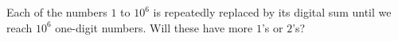 Each of the numbers $1$ to $10^6$ is repeatedly replaced by its digital sum until we reach $10^6$ one-digit numbers. Will these have more $1$'s or $2$'s?

